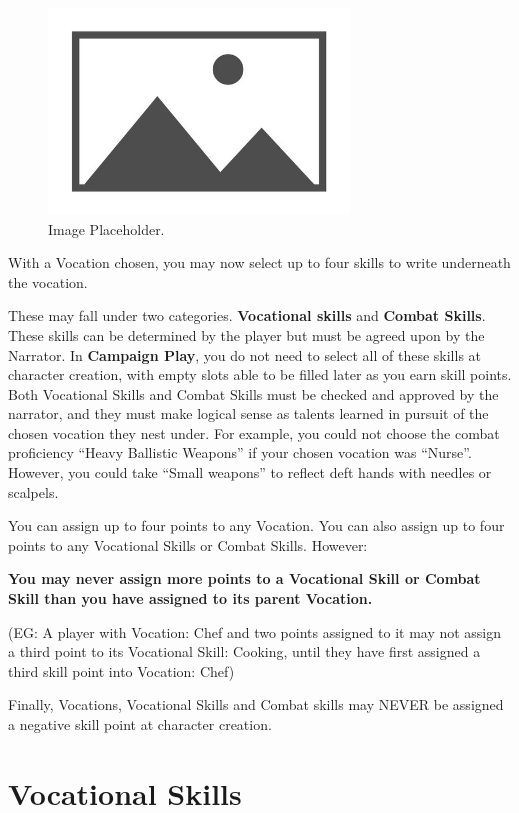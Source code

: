 \begin{figure}[H]
    \includegraphics[width=8cm]{images/placeholder}
    \centering
    \caption{Image Placeholder.}
\end{figure}

With a Vocation chosen, you may now select up to four skills to write underneath the vocation.

These may fall under two categories. \textbf{Vocational skills} and \textbf{Combat Skills}. These skills can be determined by the player but must be agreed upon by the Narrator. In \textbf{Campaign Play}, you do not need to select all of these skills at character creation, with empty slots able to be filled later as you earn skill points. Both Vocational Skills and Combat Skills must be checked and approved by the narrator, and they must make logical sense as talents learned in pursuit of the chosen vocation they nest under. For example, you could not choose the combat proficiency “Heavy Ballistic Weapons” if your chosen vocation was “Nurse”. However, you could take “Small weapons” to reflect deft hands with needles or scalpels.

You can assign up to four points to any Vocation. You can also assign up to four points to any Vocational Skills or Combat Skills. However:

\textbf{You may never assign more points to a Vocational Skill or Combat Skill than you have assigned to its parent Vocation.}

(EG: A player with Vocation: Chef and two points assigned to it may not assign a third point to its Vocational Skill: Cooking, until they have first assigned a third skill point into Vocation: Chef)

Finally, Vocations, Vocational Skills and Combat skills may NEVER be assigned a negative skill point at character creation.

\section{Vocational Skills} \label{sec:vocational_skills}

